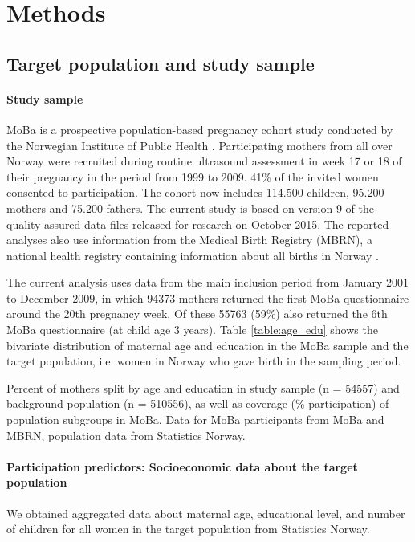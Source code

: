 \documentclass[12pt]{article}
\begin{document}
\section{Methods}

\subsection{Target population and study sample}

\paragraph{Study sample} MoBa is a prospective population-based pregnancy cohort study conducted by the Norwegian Institute of Public Health  \cite{Magnus2006-jj,Magnus2016-ht}. Participating mothers from all over Norway were recruited during routine ultrasound assessment in week 17 or 18 of their pregnancy in the period from 1999 to 2009. 41\% of the invited women consented to participation. The cohort now includes 114.500 children, 95.200 mothers and 75.200 fathers. The current study is based on version 9 of the quality-assured data files released for research on October 2015. The reported analyses also use information from the Medical Birth Registry (MBRN), a national health registry containing information about all births in Norway \cite{Irgens2000-ra}.

The current analysis uses data from the main inclusion period from January 2001 to December 2009, in which 94373 mothers returned the first MoBa questionnaire around the 20th pregnancy week. Of these 55763 (59\%) also returned the 6th MoBa questionnaire (at child age 3 years). Table \ref{table:age_edu} shows the bivariate distribution of maternal age and education in the MoBa sample and the target population, i.e. women in Norway who gave birth in the sampling period.

\begin{table}[ht]
	\caption{Percent of mothers split by age and education in study sample (n = 54557) and background population (n = 510556), as well as coverage (\% participation) of population subgroups in MoBa. Data for MoBa participants from MoBa and MBRN, population data from Statistics Norway.} 
	\label{table:age_edu}
\end{table}

\paragraph{Participation predictors: Socioeconomic data about the target population}
We obtained aggregated data about maternal age, educational level, and number of children for all women in the target population from Statistics Norway. 
\end{document}
